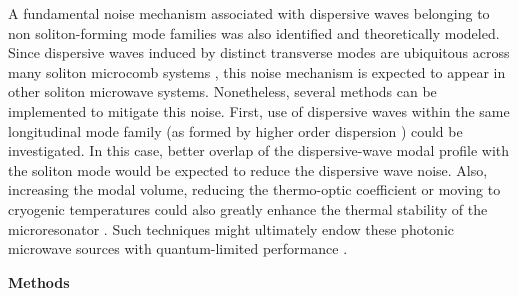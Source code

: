 \documentclass[noshowpacs,amsmath,
twocolumn,
superscriptaddress,
8pt,
aps,prb]{revtex4-2}
\begin{document}
A fundamental noise mechanism associated with dispersive waves belonging to non soliton-forming mode families was also identified and theoretically modeled. Since dispersive waves induced by distinct transverse modes are ubiquitous across many soliton microcomb systems \cite{herr2014temporal,yi2015soliton,gong2018high,he2019self,liu2020photonic}, this noise mechanism is expected to appear in other soliton microwave systems. Nonetheless, several methods can be implemented to mitigate this noise. First, use of dispersive waves within the same longitudinal mode family (as formed by higher order dispersion \cite{brasch2016photonic,pfeiffer2017octave,li2017stably,Jang2014observation}) could be investigated. In this case, better overlap of the dispersive-wave modal profile with the soliton mode would be expected to reduce the dispersive wave noise. Also, increasing the modal volume, reducing the thermo-optic coefficient or moving to cryogenic temperatures \cite{moille2020dissipative} could also greatly enhance the thermal stability of the microresonator \cite{Lee2014spiral,liang2015high}.  Such techniques might ultimately endow these photonic microwave sources with quantum-limited performance \cite{matsko2013timing}.


\bigskip

\noindent\textbf{Methods}
\end{document}
